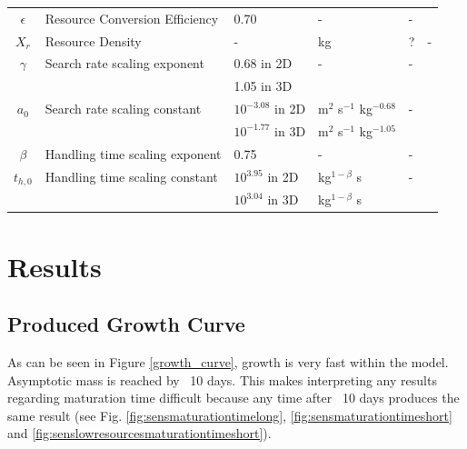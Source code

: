 \documentclass[a4paper, 11pt, hidelinks]{article} %
\begin{document}
\begin{centering}
\begin{table}[h!]
\begin{tabular}{c l l l l p{3cm}}
				$\epsilon$	& Resource Conversion Efficiency & 0.70 & - & - 		& \cite{Peters1983} \\
				$X_r$ 		& Resource Density		& -		& kg		& ?				& -\\
				$\gamma$	& Search rate scaling exponent & 0.68 in 2D	& - & - & \cite{Pawar2012} \\
				&						& 1.05 in 3D\\
				$a_0$		& Search rate scaling constant & $10^{-3.08}$ in 2D & m$^2$ s$^{-1}$ kg$^{-0.68}$   & - &\cite{Pawar2012}	\\
				&						& $10^{-1.77}$ in 3D& m$^2$ s$^{-1}$ kg$^{-1.05} $\\
				$\beta$		& Handling time scaling exponent& 0.75 & - & - & \cite{Pawar2012}\\
				$t_{h, 0}$	& Handling time scaling constant& $10^{3.95}$ in 2D &kg$^{1-\beta}$ s& -& \cite{Pawar2012}	\\
				&						& $10^{3.04}$ in 3D			&kg$^{1-\beta}$ s\\
				\hline
			\end{tabular}
		\end{table}
	\end{centering}

	\nolinenumbers
\section{Results}
	\linenumbers
	

	\subsection{Produced Growth Curve}
	As can be seen in Figure \ref{growth_curve}, growth is very fast within the model.  Asymptotic mass is reached by ~10 days.  This makes interpreting any results regarding maturation time difficult %
	because any time after ~10 days produces the same result (see Fig. \ref{fig:sensmaturationtimelong}, \ref{fig:sensmaturationtimeshort} and \ref{fig:senslowresourcesmaturationtimeshort}).
	
\end{document}
